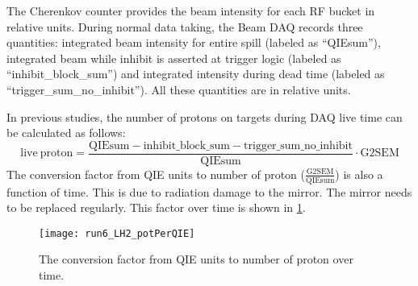 \documentclass[../main.tex]{subfiles}
\begin{document}
The Cherenkov counter provides the beam intensity for each RF bucket in relative units.
During normal data taking, the Beam DAQ records three quantities: integrated beam intensity for entire spill
(labeled as ``QIEsum''), integrated beam while inhibit is asserted at trigger logic
(labeled as ``inhibit\_block\_sum'') and integrated intensity during dead time (labeled as
``trigger\_sum\_no\_inhibit''). All these quantities are in relative units.

In previous studies, the number of protons on targets during DAQ live time can be calculated as follows:
\begin{equation}
	\mathrm{live\ proton} = \frac{\mathrm{QIEsum}-\mathrm{inhibit\_block\_sum}-\mathrm{trigger\_sum\_no\_inhibit}}{\mathrm{QIEsum}}\cdot \mathrm{G2SEM}
	\label{eq:livePoT-old}
\end{equation}
The conversion factor from QIE units to number of proton ($\frac{\mathrm{G2SEM}}{\mathrm{QIEsum}}$)
is also a function of time. This is due to radiation damage to the mirror. The mirror needs to be replaced
regularly. This factor over time is shown in \cref{fig:potperQIE}.
\begin{figure}
	\centering
	\texttt{[image: run6\_LH2\_potPerQIE]}
	\caption{The conversion factor from QIE units to number of proton over time.}
	\label{fig:potperQIE}
\end{figure}
\end{document}
